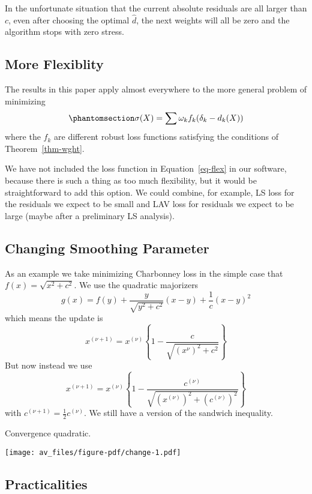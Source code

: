 \documentclass[
  12pt,
  letterpaper,
  DIV=11,
  numbers=noendperiod]{scrartcl}
\theoremstyle{definition}
\theoremstyle{definition}
\theoremstyle{plain}
\theoremstyle{plain}
\theoremstyle{plain}
\theoremstyle{remark}
\begin{document}
In the unfortunate situation that the current absolute residuals are all
larger than \(c\), even after choosing the optimal \(\hat d\), the next
weights will all be zero and the algorithm stops with zero stress.

\subsection{More Flexiblity}\label{more-flexiblity}

The results in this paper apply almost everywhere to the more general
problem of minimizing \begin{equation}\phantomsection\label{eq-flex}{
\sigma(X)=\sum\omega_kf_k(\delta_k-d_k(X))
}\end{equation} where the \(f_k\) are different robust loss functions
satisfying the conditions of Theorem~\ref{thm-wght}.

We have not included the loss function in Equation~\ref{eq-flex} in our
software, because there is such a thing as too much flexibility, but it
would be straightforward to add this option. We could combine, for
example, LS loss for the residuals we expect to be small and LAV loss
for residuals we expect to be large (maybe after a preliminary LS
analysis).

\subsection{Changing Smoothing
Parameter}\label{changing-smoothing-parameter}

As an example we take minimizing Charbonney loss in the simple case that
\(f(x)=\sqrt{x^2+c^2}\). We use the quadratic majorizers \[
g(x)=f(y)+\frac{y}{\sqrt{y^2+c^2}}(x-y)+\frac{1}{c}(x-y)^2
\] which means the update is \[
x^{(\nu+1)}=x^{(\nu)}\left\{1-\frac{c}{\sqrt{(x^{\nu})^2+c^2}}\right\}
\] But now instead we use \[
x^{(\nu+1)}=x^{(\nu)}\left\{1-\frac{c^{(\nu)}}{\sqrt{(x^{(\nu)})^2+(c^{(\nu)})^2}}\right\}
\] with \(c^{(\nu+1)}=\frac12c^{(\nu)}\). We still have a version of the
sandwich inequality.

Convergence quadratic.

\begin{center}
\texttt{[image: av\_files/figure-pdf/change-1.pdf]}
\end{center}

\subsection{Practicalities}\label{practicalities}
\end{document}
